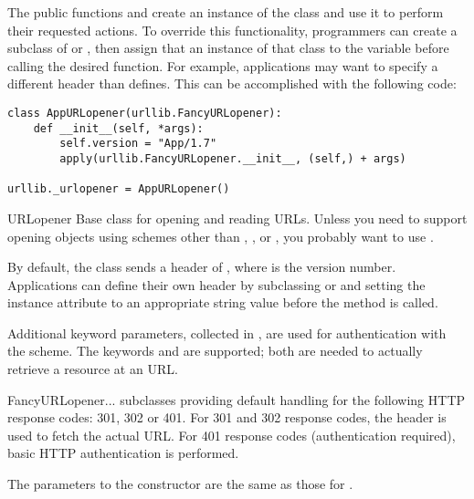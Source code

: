 The public functions  and
 create an instance of the
 class and use it to perform their requested
actions.  To override this functionality, programmers can create a
subclass of  or , then assign
that an instance of that class to the
 variable before calling the desired function.
For example, applications may want to specify a different
 header than  defines.  This can be
accomplished with the following code:

\begin{verbatim}
class AppURLopener(urllib.FancyURLopener):
    def __init__(self, *args):
        self.version = "App/1.7"
        apply(urllib.FancyURLopener.__init__, (self,) + args)

urllib._urlopener = AppURLopener()
\end{verbatim}

\begin{classdesc}{URLopener}{}
Base class for opening and reading URLs.  Unless you need to support
opening objects using schemes other than , ,
 or , you probably want to use
.

By default, the  class sends a
 header of , where
 is the  version number.  Applications can
define their own  header by subclassing
 or  and setting the instance
attribute  to an appropriate string value before the
 method is called.

Additional keyword parameters, collected in , are used for
authentication with the  scheme.  The keywords
 and  are supported; both are needed to
actually retrieve a resource at an  URL.
\end{classdesc}

\begin{classdesc}{FancyURLopener}{...}
 subclasses  providing default
handling for the following HTTP response codes: 301, 302 or 401.  For
301 and 302 response codes, the  header is used to
fetch the actual URL.  For 401 response codes (authentication
required), basic HTTP authentication is performed.

The parameters to the constructor are the same as those for
.
\end{classdesc}

